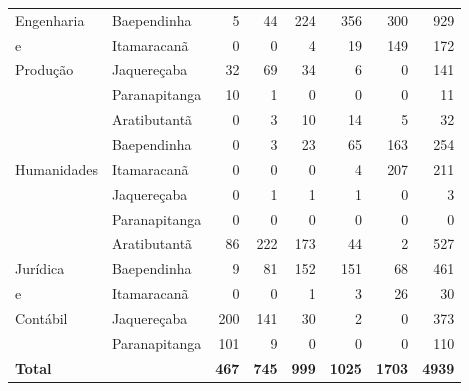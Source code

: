 \begin{table}[h]
\begin{tabular}{ll rrrrrr}
	Engenharia          & Baependinha     &   5 &  44 & 224 & 356 & 300 & 929\\ 
    e                	& Itamaracanã     &   0 &   0 &   4 &  19 & 149 & 172\\ 
    Produção            & Jaquereçaba     &  32 &  69 &  34 &   6 &   0 & 141\\ 
                        & Paranapitanga   &  10 &   1 &   0 &   0 &   0 &  11\\ 
\midrule
                    & Aratibutantã        &   0 &  3 &   10 &  14 &   5 &  32\\ 
                          & Baependinha   &   0 &  3 &   23 &  65 & 163 & 254\\ 
	Humanidades           & Itamaracanã   &   0 &  0 &    0 &   4 & 207 & 211\\ 
                          & Jaquereçaba   &   0 &  1 &    1 &   1 &   0 &   3\\ 
                          & Paranapitanga &   0 &  0 &    0 &   0 &   0 &   0\\ 
\midrule
					& Aratibutantã        &  86 & 222 & 173 &  44 &   2 & 527\\ 
    Jurídica        	& Baependinha     &   9 &  81 & 152 & 151 &  68 & 461\\ 
    e                   & Itamaracanã     &   0 &   0 &   1 &   3 &  26 &  30\\ 
	Contábil    		& Jaquereçaba     & 200 & 141 &  30 &   2 &   0 & 373\\ 
                        & Paranapitanga   & 101 &   9 &   0 &   0 &   0 & 110\\ 
\midrule
\textbf{Total}		& & \textbf{467} & \textbf{745} & \textbf{999} & \textbf{1025}& \textbf{1703}&\textbf{4939}\\        
   \bottomrule
\end{tabular}
\end{table}
